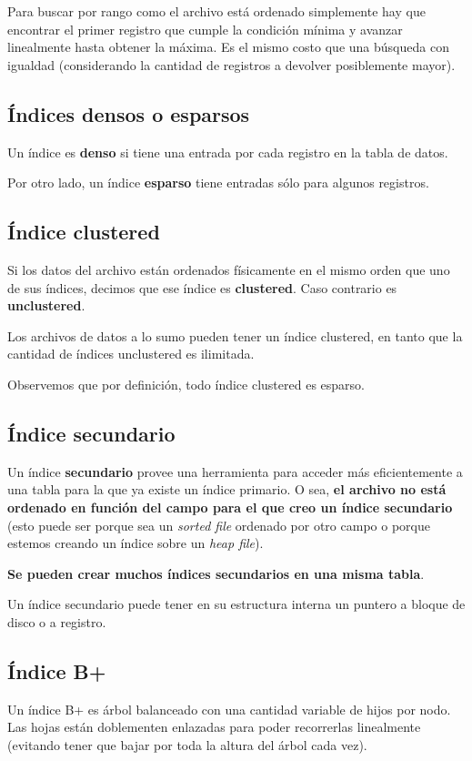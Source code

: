 \documentclass[]{article}
\begin{document}
Para buscar por rango como el archivo está ordenado simplemente hay que encontrar el primer registro que cumple la condición mínima y avanzar linealmente hasta obtener la máxima. Es el mismo costo que una búsqueda con igualdad (considerando la cantidad de registros a devolver posiblemente mayor).

\subsection{Índices densos o esparsos}
Un índice es \textbf{denso} si tiene una entrada por cada registro en la tabla de datos.

Por otro lado, un índice \textbf{esparso} tiene entradas sólo para algunos registros.


\subsection{Índice clustered}
Si los datos del archivo están ordenados físicamente en el mismo orden que uno de sus índices, decimos que ese índice es \textbf{clustered}. Caso contrario es \textbf{unclustered}.

Los archivos de datos a lo sumo pueden tener un índice clustered, en tanto que la cantidad de índices unclustered es ilimitada.

Observemos que por definición, todo índice clustered es esparso.


\subsection{Índice secundario}
Un índice \textbf{secundario} provee una herramienta para acceder más eficientemente a una tabla para la que ya existe un índice primario. O sea, \textbf{el archivo no está ordenado en función del campo para el que creo un índice secundario} (esto puede ser porque sea un \emph{sorted file} ordenado por otro campo o porque estemos creando un índice sobre un \emph{heap file}).

\textbf{Se pueden crear muchos índices secundarios en una misma tabla}.

Un índice secundario puede tener en su estructura interna un puntero a bloque de disco o a registro.


\subsection{Índice B+}
Un índice B+ es árbol balanceado con una cantidad variable de hijos por nodo. Las hojas están doblementen enlazadas para poder recorrerlas linealmente (evitando tener que bajar por toda la altura del árbol cada vez).
\end{document}

